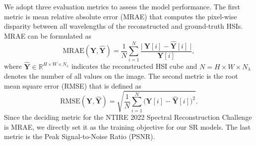 \documentclass[10pt,twocolumn,letterpaper]{article}
\begin{document}
We adopt three evaluation metrics to assess the model performance. The first metric is mean relative absolute error (MRAE) that computes the pixel-wise disparity between all wavelengths of the reconstructed and ground-truth HSIs. MRAE can be formulated as
\begin{equation}
	\text{MRAE}(\mathbf{Y},\mathbf{\hat{Y}}) = \frac{1}{N} \sum_{i=1}^{N} \frac{\big|~\mathbf{Y}[i] - \mathbf{\hat{Y}}[i]~\big|}{\mathbf{Y}[i]},
\end{equation}
where $\mathbf{\hat{Y}} \in \mathbb{R}^{H\times W\times N_{\lambda}}$ indicates the reconstructed HSI cube and $N = H\times W\times N_{\lambda}$ denotes the number of all values on the image. The second metric is the root mean square error (RMSE) that is defined as
\begin{equation}
\text{RMSE}(\mathbf{Y},\mathbf{\hat{Y}}) = \sqrt{\frac{1}{N} \sum_{i=1}^{N} \big(\mathbf{Y}[i] - \mathbf{\hat{Y}}[i]\big)^2}.
\end{equation}
Since the deciding metric for the NTIRE 2022 Spectral Reconstruction Challenge is MRAE, we directly set it as the training objective for our SR  models. The last metric is the Peak Signal-to-Noise Ratio (PSNR).
\end{document}
